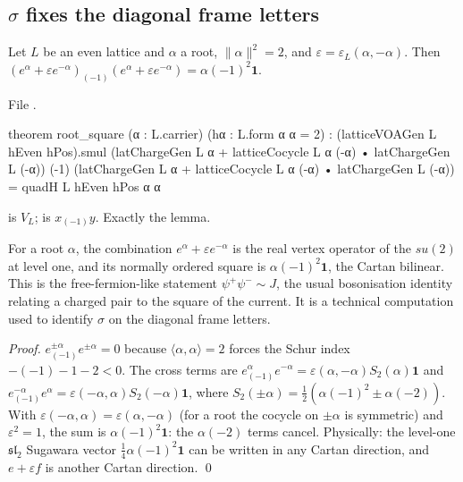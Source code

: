 \subsection{\texorpdfstring{$\sigma$ fixes the diagonal frame letters}{sigma fixes the diagonal frame letters}}
\begin{lemma}\label{ch13:lem:root-square}
Let $L$ be an even lattice and $\alpha$ a root, $\|\alpha\|^2=2$, and $\varepsilon=\varepsilon_L(\alpha,-\alpha)$. Then
$(e^\alpha+\varepsilon e^{-\alpha})_{(-1)}(e^\alpha+\varepsilon e^{-\alpha})=\alpha(-1)^2\mathbf 1$.
\end{lemma}
\noindent File .
\begin{leancode}
theorem root_square (α : L.carrier) (hα : L.form α α = 2) :
    (latticeVOAGen L hEven hPos).smul
        (latChargeGen L α + latticeCocycle L α (-α) • latChargeGen L (-α)) (-1)
        (latChargeGen L α + latticeCocycle L α (-α) • latChargeGen L (-α))
      = quadH L hEven hPos α α
\end{leancode}
\begin{dictionary}
 is $V_L$;  is $x_{(-1)}y$. Exactly the lemma.
\end{dictionary}
\begin{physics}
For a root $\alpha$, the combination $e^\alpha+\varepsilon e^{-\alpha}$ is the real vertex operator of the $su(2)$ at level one, and its normally ordered square is $\alpha(-1)^2\mathbf 1$, the Cartan bilinear. This is the free-fermion-like statement $\psi^+\psi^-\sim J$, the usual bosonisation identity relating a charged pair to the square of the current. It is a technical computation used to identify $\sigma$ on the diagonal frame letters.
\end{physics}
\noindent\emph{Proof.} $e^{\pm\alpha}_{(-1)}e^{\pm\alpha}=0$ because $\langle\alpha,\alpha\rangle=2$ forces the Schur
index $-(-1)-1-2<0$. The cross terms are $e^\alpha_{(-1)}e^{-\alpha}=\varepsilon(\alpha,-\alpha)S_2(\alpha)\mathbf 1$ and
$e^{-\alpha}_{(-1)}e^\alpha=\varepsilon(-\alpha,\alpha)S_2(-\alpha)\mathbf 1$, where
$S_2(\pm\alpha)=\tfrac12(\alpha(-1)^2\pm\alpha(-2))$. With $\varepsilon(-\alpha,\alpha)=\varepsilon(\alpha,-\alpha)$ (for a root the
cocycle on $\pm\alpha$ is symmetric) and $\varepsilon^2=1$, the sum is $\alpha(-1)^2\mathbf 1$: the $\alpha(-2)$ terms
cancel. Physically: the level-one $\mathfrak{sl}_2$ Sugawara vector $\tfrac14\alpha(-1)^2\mathbf 1$ can be
written in any Cartan direction, and $e+\varepsilon f$ is another Cartan direction. \qed

